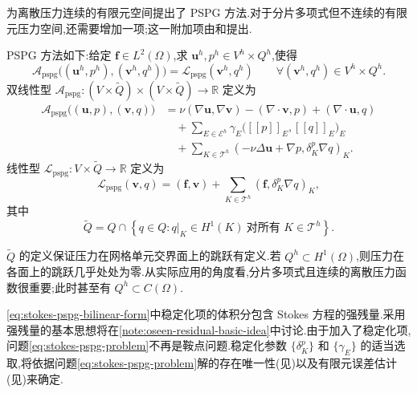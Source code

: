 \begin{note}\label{note:stokes-pspg-introduction}
\textcite{HughesFrancaBalestra1986}为离散压力连续的有限元空间提出了 PSPG 方法.对于分片多项式但不连续的有限元压力空间,还需要增加一项;这一附加项由\textcite{HughesFranca1987}和\textcite{DouglasWang1989}提出.

PSPG 方法如下:给定 $\bm{f}\in L^2(\Omega)$,求 $\bm{u}^h,p^h\in V^h\times Q^h$,使得
\begin{equation}\label{eq:stokes-pspg-problem}
 \mathcal{A}_{\mathrm{pspg}}\bigl((\bm{u}^h,p^h),
        (\bm{v}^h,q^h)\bigr)
 =\mathcal{L}_{\mathrm{pspg}}(\bm{v}^h,q^h)
 \qquad\forall(\bm{v}^h,q^h)\in V^h\times Q^h.
\end{equation}
双线性型 $\mathcal{A}_{\mathrm{pspg}}:(V\times\widetilde{Q})\times(V\times\widetilde{Q})\to\mathbb{R}$ 定义为
\begin{equation}\label{eq:stokes-pspg-bilinear-form}
\begin{aligned}
 \mathcal{A}_{\mathrm{pspg}}\bigl((\bm{u},p),(\bm{v},q)\bigr)
 &=\nu(\nabla\bm{u},\nabla\bm{v})
   -(\nabla\cdot\bm{v},p)+(\nabla\cdot\bm{u},q)\\
 &\quad+\sum_{E\in\mathcal{E}^h}
   \gamma_E\bigl(\left[\!\left[p\right]\!\right]_E,
                 \left[\!\left[q\right]\!\right]_E\bigr)_E\\
 &\quad+\sum_{K\in\mathcal{T}^h}
   (-\nu\Delta\bm{u}+\nabla p,
      \delta_K^p\nabla q)_K .
\end{aligned}
\end{equation}
线性型 $\mathcal{L}_{\mathrm{pspg}}:V\times\widetilde{Q}\to\mathbb{R}$ 定义为
\begin{equation}\label{eq:stokes-pspg-linear-form}
 \mathcal{L}_{\mathrm{pspg}}(\bm{v},q)
 =(\bm{f},\bm{v})
   +\sum_{K\in\mathcal{T}^h}
       (\bm{f},\delta_K^p\nabla q)_K,
\end{equation}
其中
\begin{equation}\label{eq:stokes-pspg-pressure-test-space}
 \widetilde{Q}=Q\cap\left\{q\in Q:
       q|_K\in H^1(K)\ \text{对所有 }K\in\mathcal{T}^h\right\}.
\end{equation}

$\widetilde{Q}$ 的定义保证压力在网格单元交界面上的跳跃有定义.若 $Q^h\subset H^1(\Omega)$,则压力在各面上的跳跃几乎处处为零.从实际应用的角度看,分片多项式且连续的离散压力函数很重要;此时甚至有 $Q^h\subset C(\Omega)$.

\cref{eq:stokes-pspg-bilinear-form}中稳定化项的体积分包含 Stokes 方程的强残量.采用强残量的基本思想将在\cref{note:oseen-residual-basic-idea}中讨论.由于加入了稳定化项,问题\cref{eq:stokes-pspg-problem}不再是鞍点问题.稳定化参数 $\{\delta_K^p\}$ 和 $\{\gamma_E\}$ 的适当选取,将依据问题\cref{eq:stokes-pspg-problem}解的存在唯一性(见)以及有限元误差估计(见)来确定.
\end{note}

